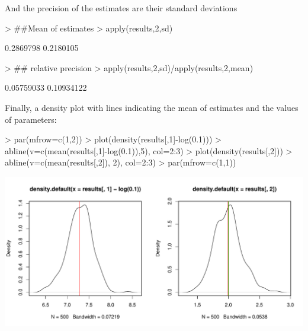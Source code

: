 \documentclass[11pt, A4]{article}
\begin{document}
And the precision of the estimates are their standard deviations

\begin{Schunk}
\begin{Sinput}
> ##Mean of estimates
> apply(results,2,sd)
\end{Sinput}
\begin{Soutput}
[1] 0.2869798 0.2180105
\end{Soutput}
\begin{Sinput}
> ## relative precision
> apply(results,2,sd)/apply(results,2,mean)
\end{Sinput}
\begin{Soutput}
[1] 0.05759033 0.10934122
\end{Soutput}
\end{Schunk}

Finally, a density plot with lines indicating the mean of estimates and the values of parameters:
\begin{Schunk}
\begin{Sinput}
> par(mfrow=c(1,2))
> plot(density(results[,1]-log(0.1)))
> abline(v=c(mean(results[,1]-log(0.1)),5), col=2:3)
> plot(density(results[,2]))
> abline(v=c(mean(results[,2]), 2), col=2:3)
> par(mfrow=c(1,1))
\end{Sinput}
\end{Schunk}
\includegraphics{sads_quick_reference-rsads-bias-plots}




\end{document}
